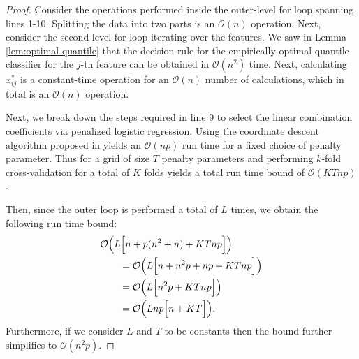 \begin{proof}
  Consider the operations performed inside the outer-level for loop spanning
  lines 1-10.  Splitting the data into two parts is an $\mathcal{O}(n)$
  operation.  Next, consider the second-level for loop iterating over the
  features.  We saw in Lemma \ref{lem:optimal-quantile} that the decision rule
  for the empirically optimal quantile classifier for the $j$-th feature can be
  obtained in $\mathcal{O}(n^2)$ time.  Next, calculating $x_{ij}^{*}$ is a
  constant-time operation for an $\mathcal{O}(n)$ number of calculations, which
  in total is an $\mathcal{O}(n)$ operation.

  Next, we break down the steps required in line 9 to select the linear
  combination coefficients via penalized logistic regression.  Using the
  coordinate descent algorithm proposed in \cite{friedman2007, friedman2010}
  yields an $\mathcal{O}(np)$ run time for a fixed choice of penalty parameter.
  Thus for a grid of size $T$ penalty parameters and performing $k$-fold
  cross-validation for a total of $K$ folds yields a total run time bound of
  $\mathcal{O}(KTnp)$.

  Then, since the outer loop is performed a total of $L$ times, we obtain the
  following run time bound:
  \begin{align}
    \label{eq:classifier-runtime}
    \begin{split} \MoveEqLeft
      \mathcal{O}\Big( L \Big[ n + p(n^2 + n) + KTnp \Big] \Big) \\
      &= \mathcal{O}\Big( L \Big[ n + n^2 p + np + KTnp \Big] \Big) \\
      &= \mathcal{O}\Big( L \Big[ n^2 p + KTnp \Big] \Big) \\
      &= \mathcal{O}\Big( Lnp \Big[ n + KT \Big] \Big).
    \end{split}
  \end{align}
  Furthermore, if we consider $L$ and $T$ to be constants then the bound further
  simplifies to $\mathcal{O}(n^2 p)$.
\end{proof}

